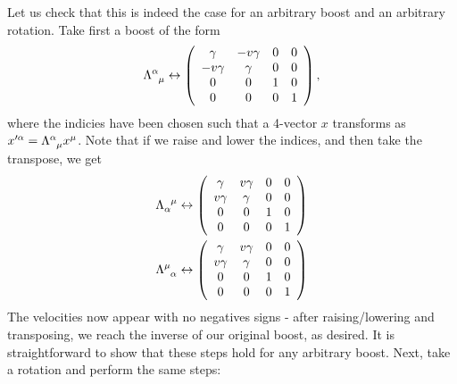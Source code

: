 \documentclass{mathnotes}
\begin{document}
Let us check that this is indeed the case for an arbitrary boost and an arbitrary rotation. Take first a boost of the form
\begin{align*}
    \tensor{\Lambda}{^\alpha_\mu}\leftrightarrow\left(\begin{array}{cccc}
        \gamma & -v\gamma & 0 & 0\\
        -v\gamma & \gamma & 0 & 0\\
        0 & 0 & 1 & 0\\
        0 & 0 & 0 & 1
    \end{array}\right),
\end{align*}
where the indicies have been chosen such that a 4-vector $x$ transforms as $x'^{\alpha}=\tensor{\Lambda}{^\alpha_\mu}x^\mu$. Note that if we raise and lower the indices,
and then take the transpose, we get
\begin{align*}
    \tensor{\Lambda}{_\alpha^\mu}\leftrightarrow\left(\begin{array}{cccc}
        \gamma & v\gamma & 0 & 0\\
        v\gamma & \gamma & 0 & 0\\
        0 & 0 & 1 & 0\\
        0 & 0 & 0 & 1
    \end{array}\right)\\
    \tensor{\Lambda}{^\mu_\alpha}\leftrightarrow\left(\begin{array}{cccc}
        \gamma & v\gamma & 0 & 0\\
        v\gamma & \gamma & 0 & 0\\
        0 & 0 & 1 & 0\\
        0 & 0 & 0 & 1
    \end{array}\right)
\end{align*}
The velocities now appear with no negatives signs - after raising/lowering and transposing, we reach the inverse of our original boost, as desired. It
is straightforward to show that these steps hold for any arbitrary boost. Next, take a rotation and perform the same steps:
\end{document}
